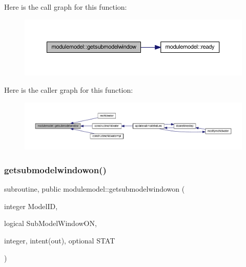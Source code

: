 Here is the call graph for this function\+:\nopagebreak
\begin{figure}[H]
\begin{center}
\leavevmode
\includegraphics[width=350pt]{namespacemodulemodel_a61debfb6b3b629e1cd4bbdfe3c1c1ad1_cgraph}
\end{center}
\end{figure}
Here is the caller graph for this function\+:\nopagebreak
\begin{figure}[H]
\begin{center}
\leavevmode
\includegraphics[width=350pt]{namespacemodulemodel_a61debfb6b3b629e1cd4bbdfe3c1c1ad1_icgraph}
\end{center}
\end{figure}
\mbox{\label{namespacemodulemodel_a2bb34f8b006f66681bc7e7276eb4579e}} 
\subsubsection{\texorpdfstring{getsubmodelwindowon()}{getsubmodelwindowon()}}
{\footnotesize\ttfamily subroutine, public modulemodel\+::getsubmodelwindowon (\begin{DoxyParamCaption}\item[{integer}]{Model\+ID,  }\item[{logical}]{Sub\+Model\+Window\+ON,  }\item[{integer, intent(out), optional}]{S\+T\+AT }\end{DoxyParamCaption})}

